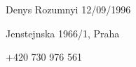 

\def\name{Denys Rozumnyi}
\def\birthday{12/09/1996}
\def\address{Jenstejnska 1966/1, Praha}
\def\phone{+420 730 976 561}

\chap \name
\birthday 

\address 

\phone
 
\bye